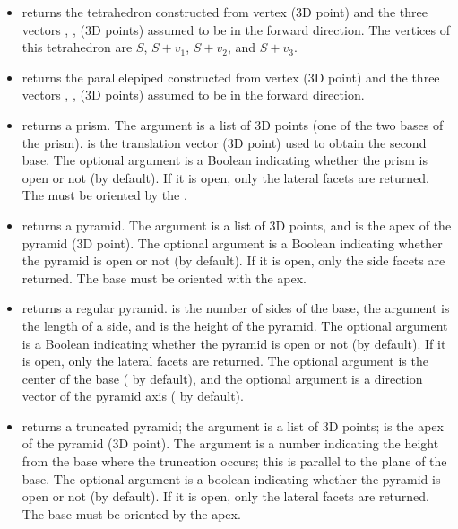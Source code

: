\begin{itemize}
    \item {} returns the tetrahedron constructed from vertex  (3D point) and the three vectors , ,  (3D points) assumed to be in the forward direction. The vertices of this tetrahedron are $S$, $S+v_1$, $S+v_2$, and $S+v_3$.

    \item {} returns the parallelepiped constructed from vertex  (3D point) and the three vectors , ,  (3D points) assumed to be in the forward direction.

    \item {} returns a prism. The argument  is a list of 3D points (one of the two bases of the prism).  is the translation vector (3D point) used to obtain the second base. The optional argument  is a Boolean indicating whether the prism is open or not (\false by default). If it is open, only the lateral facets are returned. The  must be oriented by the .

    \item {} returns a pyramid. The argument  is a list of 3D points, and  is the apex of the pyramid (3D point). The optional argument  is a Boolean indicating whether the pyramid is open or not (\false by default). If it is open, only the side facets are returned. The base must be oriented with the apex.

    \item {} returns a regular pyramid.  is the number of sides of the base, the argument  is the length of a side, and  is the height of the pyramid. The optional argument  is a Boolean indicating whether the pyramid is open or not (\false by default). If it is open, only the lateral facets are returned. The optional argument  is the center of the base ( by default), and the optional argument  is a direction vector of the pyramid axis ( by default).

    \item {} returns a truncated pyramid; the argument  is a list of 3D points;  is the apex of the pyramid (3D point). The argument  is a number indicating the height from the base where the truncation occurs; this is parallel to the plane of the base. The optional argument  is a boolean indicating whether the pyramid is open or not (\false by default). If it is open, only the lateral facets are returned. The base must be oriented by the apex.


\end{itemize}
